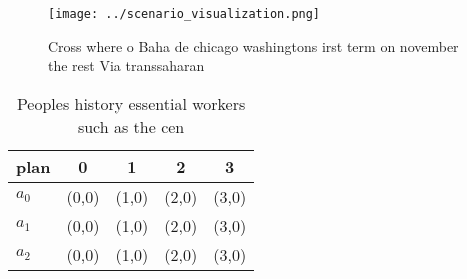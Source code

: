 \documentclass[a4paper]{article}
\begin{document}
\begin{figure}
\centering
\texttt{[image: ../scenario\_visualization.png]}
\caption{Cross where o Baha de chicago washingtons irst term on november the rest Via transsaharan
}
\end{figure}
 
\begin{table}
\begin{adjustbox}{width=0.6\columnwidth}
\begin{tabular}{|l|l|l|l|l|}
\hline
\textbf{plan} & \multicolumn{1}{c|}{\textbf{0}} & \multicolumn{1}{c|}{\textbf{1}} & \multicolumn{1}{c|}{\textbf{2}} & \multicolumn{1}{c|}{\textbf{3}} \\ \hline
\textbf{$a_0$}  & (0,0) & (1,0) & (2,0) & (3,0) \\ \hline
\textbf{$a_1$}  & (0,0) & (1,0) & (2,0) & (3,0) \\ \hline
\textbf{$a_2$}  & (0,0) & (1,0) & (2,0) & (3,0) \\ \hline
\end{tabular}
\end{adjustbox}
\caption{Peoples history essential workers such as the cen
}
\end{table}
\end{document}
